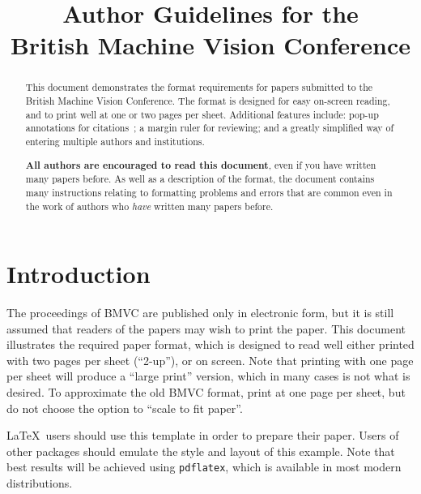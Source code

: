 \documentclass{bmvc2k}
\title{Author Guidelines for the\\ British Machine Vision Conference}
\begin{document}
\maketitle

\begin{abstract}
This document demonstrates the format requirements for papers submitted
to the British Machine Vision Conference.  The format is designed for
easy on-screen reading, and to print well at one or two pages per sheet.
Additional features include: pop-up annotations for
citations~\cite{Authors06,Mermin89}; a margin ruler for reviewing; and a
greatly simplified way of entering multiple authors and institutions.

{\bf All authors are encouraged to read this document}, even if you have
written many papers before.  As well as a description of the format, the
document contains many instructions relating to formatting problems and
errors that are common even in the work of authors who {\em have}
written many papers before.
\end{abstract}

\section{Introduction}
\label{sec:intro}
The proceedings of BMVC are published only in electronic form, but it is still assumed
that readers of the papers may wish to print the paper.   This document
illustrates the required paper format, which is designed to read well either printed
with two pages per sheet (``2-up''), or on screen.  Note that printing with one page 
per sheet will produce a ``large print'' version, which in many cases is not what is desired.
To approximate the old BMVC format, print at one page per sheet, but do not choose
the option to ``scale to fit paper''.

\LaTeX\ users should use this template in order to prepare their paper.
Users of other packages should emulate the style and layout of this
example.  Note that best results will be achieved using {\tt pdflatex},
which is available in most modern distributions.
\end{document}
